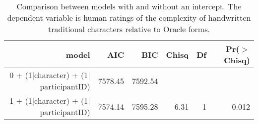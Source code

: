 \begin{table}[ht]
\centering
\begin{tabular}{rrrrrr}
  \hline
model & AIC & BIC & Chisq & Df & Pr($>$Chisq) \\ 
  \hline
0 + (1$|$character) + (1$|$participantID) & 7578.45 & 7592.54 &  &  &  \\ 
  1 + (1$|$character) + (1$|$participantID) & 7574.14 & 7595.28 & 6.31 & 1 & 0.012 \\ 
   \hline
\end{tabular}
\caption{Comparison between models with and without an intercept. The dependent variable is human ratings of the complexity of handwritten traditional characters relative to Oracle forms.} 
\label{tab:regtable_exp_hw}
\end{table}
